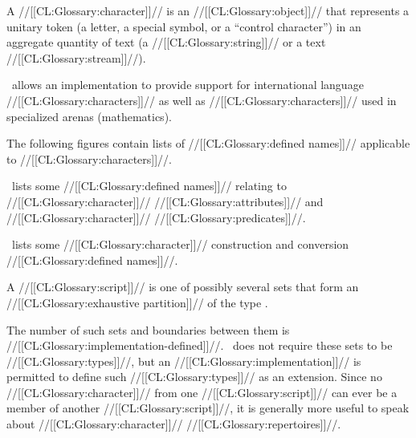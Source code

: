


A //[[CL:Glossary:character]]// is an //[[CL:Glossary:object]]// that represents a unitary token 
(\eg a letter, a special symbol, or a ``control character'')
in an aggregate quantity of text
(\eg a //[[CL:Glossary:string]]// or a text //[[CL:Glossary:stream]]//).

\clisp\ allows an implementation to provide support 
for international language //[[CL:Glossary:characters]]// as well
as //[[CL:Glossary:characters]]// used in specialized arenas (\eg mathematics).


The following figures contain lists of //[[CL:Glossary:defined names]]// applicable to 
//[[CL:Glossary:characters]]//.

\Thenextfigure\ lists some //[[CL:Glossary:defined names]]// relating to 
//[[CL:Glossary:character]]// //[[CL:Glossary:attributes]]// and //[[CL:Glossary:character]]// //[[CL:Glossary:predicates]]//.

                           
\Thenextfigure\ lists some //[[CL:Glossary:character]]// construction and conversion //[[CL:Glossary:defined names]]//.


\endsubSection%



A //[[CL:Glossary:script]]// is one of possibly several sets that form an //[[CL:Glossary:exhaustive partition]]//
of the type .

The number of such sets and boundaries between them is //[[CL:Glossary:implementation-defined]]//.
\clisp\ does not require these sets to be //[[CL:Glossary:types]]//, but an //[[CL:Glossary:implementation]]//
is permitted to define such //[[CL:Glossary:types]]// as an extension.  Since no //[[CL:Glossary:character]]//
from one //[[CL:Glossary:script]]// can ever be a member of another //[[CL:Glossary:script]]//, it is generally
more useful to speak about //[[CL:Glossary:character]]// //[[CL:Glossary:repertoires]]//.


